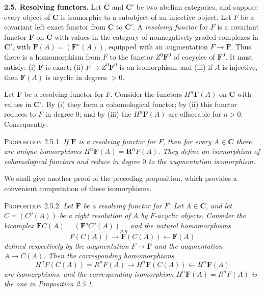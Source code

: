
\textbf{2.5. Resolving functors.} 
Let $\mathbf{C}$ and $\mathbf{C}'$ be two abelian categories, and suppose every object of $\mathbf{C}$
is isomorphic to a subobject of an injective object. Let $F$ be a covariant
left exact functor from $\mathbf{C}$ to $\mathbf{C}'$. A \textit{resolving functor} for $F$ is
a covariant functor $\mathbf F$ on $\mathbf{C}$ with values in the category of
nonnegatively graded complexes in $\mathbf{C}'$, with
$\mathbf F(A)=(\mathbf F^n(A))$, equipped with an augmentation
$F\to\mathbf F$. Thus there is a homomorphism from $F$ to the
functor $Z^0\mathbf F^0$ of cocycles of $\mathbf F^0$. It must satisfy:
(i) $\mathbf F$ is exact; (ii) $F\to Z^0\mathbf F^0$ is an
isomorphism; and (iii) if $A$ is injective, then $\mathbf F(A)$ is acyclic in
degrees $>0$.

Let $\mathbf F$ be a resolving functor for $F$. Consider the functors
$H^n\mathbf F(A)$ on $\mathbf{C}$ with values in $\mathbf{C}'$. By (i) they form a
cohomological functor; by (ii) this functor reduces to $F$ in degree 0; and by
(iii) the $H^n\mathbf F(A)$ are effaceable for $n>0$. Consequently:

\textsc{Proposition 2.5.1.} \textit{If $\mathbf F$ is a resolving
functor for $F$, then for every $A\in \mathbf{C}$ there are unique isomorphisms
$H^n\mathbf F(A)=\mathbf{R}^nF(A)$. They define an isomorphism of cohomological
functors and reduce in degree $0$ to the augmentation isomorphism.}

We shall give another proof of the preceding proposition, which provides a
convenient computation of these isomorphisms.

\textsc{Proposition 2.5.2.} \textit{Let $\mathbf F$ be a resolving
functor for $F$. Let $A\in \mathbf{C}$, and let $C=(C^p(A))$ be a right resolution of
$A$ by $F$-acyclic objects. Consider the bicomplex
$\mathbf F C(A)=(\mathbf F^qC^p(A))_{p,q}$ and the natural homomorphisms}
\[
\tag{2.5.1}
F(C(A))\to\mathbf F(C(A))\leftarrow\mathbf F(A)
\]
\textit{defined respectively by the augmentation
$F\to\mathbf F$ and the augmentation
$A\to C(A)$. Then the corresponding homomorphisms}
\[
\tag{2.5.2}
H^nF(C(A))=R^nF(A)\to H^n\mathbf F(C(A))
\leftarrow H^n\mathbf F(A)
\]
\textit{are isomorphisms, and the corresponding isomorphism
$H^n\mathbf F(A)=R^nF(A)$ is the one in Proposition \textup{2.5.1.}}

